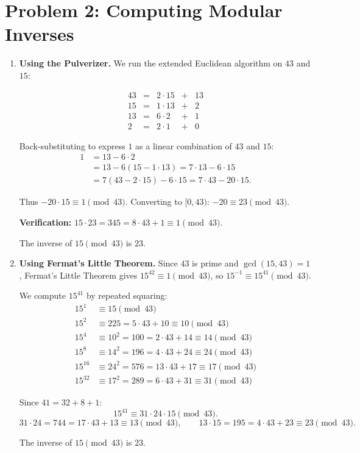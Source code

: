 \documentclass[11pt]{article}
\begin{document}
\section*{Problem 2: Computing Modular Inverses}
\begin{enumerate}[label=\textbf{(\alph*)}]

\item \textbf{Using the Pulverizer.} We run the extended Euclidean algorithm on $43$ and $15$:

\[
\begin{array}{rcrcr}
43 &=& 2\cdot 15 &+& 13 \\
15 &=& 1\cdot 13 &+& 2  \\
13 &=& 6\cdot 2  &+& 1  \\
2  &=& 2\cdot 1  &+& 0
\end{array}
\]

Back-substituting to express $1$ as a linear combination of $43$ and $15$:
\begin{align*}
1 &= 13 - 6\cdot 2 \\
  &= 13 - 6(15 - 1\cdot 13) = 7\cdot 13 - 6\cdot 15 \\
  &= 7(43 - 2\cdot 15) - 6\cdot 15 = 7\cdot 43 - 20\cdot 15.
\end{align*}

Thus $-20 \cdot 15 \equiv 1 \pmod{43}$. Converting to $[0, 43)$: $-20 \equiv 23 \pmod{43}$.

\textbf{Verification:} $15 \cdot 23 = 345 = 8 \cdot 43 + 1 \equiv 1\pmod{43}$. \checkmark

The inverse of $15 \pmod{43}$ is $\boxed{23}$.

\item \textbf{Using Fermat's Little Theorem.} Since $43$ is prime and $\gcd(15,43)=1$, Fermat's Little Theorem gives $15^{42}\equiv 1\pmod{43}$, so $15^{-1}\equiv 15^{41}\pmod{43}$.

We compute $15^{41}$ by repeated squaring:
\begin{align*}
15^1 &\equiv 15 \pmod{43}\\
15^2 &\equiv 225 = 5\cdot 43 + 10 \equiv 10 \pmod{43}\\
15^4 &\equiv 10^2 = 100 = 2\cdot 43 + 14 \equiv 14 \pmod{43}\\
15^8 &\equiv 14^2 = 196 = 4\cdot 43 + 24 \equiv 24 \pmod{43}\\
15^{16}&\equiv 24^2 = 576 = 13\cdot 43 + 17 \equiv 17 \pmod{43}\\
15^{32}&\equiv 17^2 = 289 = 6\cdot 43 + 31 \equiv 31 \pmod{43}
\end{align*}

Since $41 = 32 + 8 + 1$:
\[
15^{41} \equiv 31 \cdot 24 \cdot 15 \pmod{43}.
\]
\[
31\cdot 24 = 744 = 17\cdot 43 + 13 \equiv 13\pmod{43},\qquad
13\cdot 15 = 195 = 4\cdot 43 + 23 \equiv 23\pmod{43}.
\]

The inverse of $15 \pmod{43}$ is $\boxed{23}$.

\end{enumerate}
\end{document}
